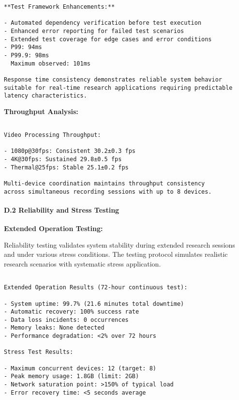 \documentclass[12pt,a4paper]{report}
\begin{document}
{{\begin{verbatim}
**Test Framework Enhancements:**

- Automated dependency verification before test execution
- Enhanced error reporting for failed test scenarios
- Extended test coverage for edge cases and error conditions
- P99: 94ms
- P99.9: 98ms
  Maximum observed: 101ms

Response time consistency demonstrates reliable system behavior
suitable for real-time research applications requiring predictable
latency characteristics.

\end{verbatim}

\textbf{Throughput Analysis:}
\begin{verbatim}

Video Processing Throughput:

- 1080p@30fps: Consistent 30.2±0.3 fps
- 4K@30fps: Sustained 29.8±0.5 fps
- Thermal@25fps: Stable 25.1±0.2 fps

Multi-device coordination maintains throughput consistency
across simultaneous recording sessions with up to 8 devices.

\end{verbatim}

\paragraph{D.2 Reliability and Stress Testing}

\textbf{Extended Operation Testing:}

Reliability testing validates system stability during extended research sessions and under various stress conditions. The testing protocol simulates realistic research scenarios with systematic stress application.

\begin{verbatim}

Extended Operation Results (72-hour continuous test):

- System uptime: 99.7% (21.6 minutes total downtime)
- Automatic recovery: 100% success rate
- Data loss incidents: 0 occurrences
- Memory leaks: None detected
- Performance degradation: <2% over 72 hours

Stress Test Results:

- Maximum concurrent devices: 12 (target: 8)
- Peak memory usage: 1.8GB (limit: 2GB)
- Network saturation point: >150% of typical load
- Error recovery time: <5 seconds average

\end{verbatim}

}}
\end{document}
